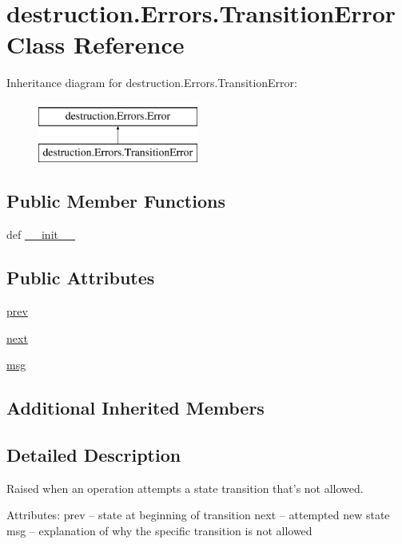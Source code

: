 \hypertarget{classdestruction_1_1_errors_1_1_transition_error}{\section{destruction.\-Errors.\-Transition\-Error Class Reference}
\label{classdestruction_1_1_errors_1_1_transition_error}
}
Inheritance diagram for destruction.\-Errors.\-Transition\-Error\-:\begin{figure}[H]
\begin{center}
\leavevmode
\includegraphics[height=2.000000cm]{classdestruction_1_1_errors_1_1_transition_error}
\end{center}
\end{figure}
\subsection*{Public Member Functions}
\begin{DoxyCompactItemize}
\item 
def \hyperlink{classdestruction_1_1_errors_1_1_transition_error_a50c32bd6bd777a52bfdbc91b0cbb4a0c}{\-\_\-\-\_\-init\-\_\-\-\_\-}
\end{DoxyCompactItemize}
\subsection*{Public Attributes}
\begin{DoxyCompactItemize}
\item 
\hyperlink{classdestruction_1_1_errors_1_1_transition_error_a83ab31fda6af643f87cc710f917a7673}{prev}
\item 
\hyperlink{classdestruction_1_1_errors_1_1_transition_error_ac828971324ebd580a8b2f4af26003953}{next}
\item 
\hyperlink{classdestruction_1_1_errors_1_1_transition_error_a14f13180b917916938987f96bc0d9c35}{msg}
\end{DoxyCompactItemize}
\subsection*{Additional Inherited Members}


\subsection{Detailed Description}
\begin{DoxyVerb}Raised when an operation attempts a state transition that's not
allowed.

Attributes:
    prev -- state at beginning of transition
    next -- attempted new state
    msg  -- explanation of why the specific transition is not allowed
\end{DoxyVerb}
 


